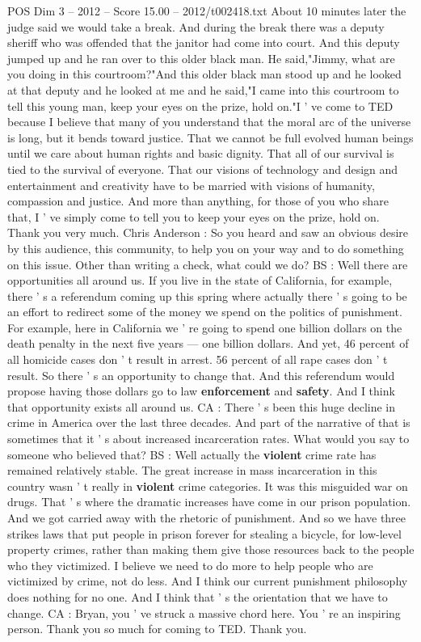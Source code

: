 \begin{textsample}{POS Dim 3 – 2012 – Score 15.00 – 2012/t002418.txt}
About 10 minutes later the judge said we would take a break.
And during the break there was a deputy sheriff who was offended that the janitor had come into court.
And this deputy jumped up and he ran over to this older black man.
He said,"Jimmy, what are you doing in this courtroom?"And this older black man stood up and he looked at that deputy and he looked at me and he said,"I came into this courtroom to tell this young man, keep your eyes on the prize, hold on."I ' ve come to TED because I believe that many of you understand that the moral arc of the universe is long, but it bends toward justice.
That we cannot be full evolved human beings until we care about human rights and basic dignity.
That all of our survival is tied to the survival of everyone.
That our visions of technology and design and entertainment and creativity have to be married with visions of humanity, compassion and justice.
And more than anything, for those of you who share that, I ' ve simply come to tell you to keep your eyes on the prize, hold on.
Thank you very much.
Chris Anderson : So you heard and saw an obvious desire by this audience, this community, to help you on your way and to do something on this issue.
Other than writing a check, what could we do?
BS : Well there are opportunities all around us.
If you live in the state of California, for example, there ' s a referendum coming up this spring where actually there ' s going to be an effort to redirect some of the money we spend on the politics of punishment.
For example, here in California we ' re going to spend one billion dollars on the death penalty in the next five years — one billion dollars.
And yet, 46 percent of all homicide cases don ' t result in arrest. 56 percent of all rape cases don ' t result.
So there ' s an opportunity to change that.
And this referendum would propose having those dollars go to law \textbf{enforcement} and \textbf{safety}.
And I think that opportunity exists all around us.
CA : There ' s been this huge decline in crime in America over the last three decades.
And part of the narrative of that is sometimes that it ' s about increased incarceration rates.
What would you say to someone who believed that?
BS : Well actually the \textbf{violent} crime rate has remained relatively stable.
The great increase in mass incarceration in this country wasn ' t really in \textbf{violent} crime categories.
It was this misguided war on drugs.
That ' s where the dramatic increases have come in our prison population.
And we got carried away with the rhetoric of punishment.
And so we have three strikes laws that put people in prison forever for stealing a bicycle, for low-level property crimes, rather than making them give those resources back to the people who they victimized.
I believe we need to do more to help people who are victimized by crime, not do less.
And I think our current punishment philosophy does nothing for no one.
And I think that ' s the orientation that we have to change.
CA : Bryan, you ' ve struck a massive chord here.
You ' re an inspiring person.
Thank you so much for coming to TED.
Thank you.

\end{textsample}
